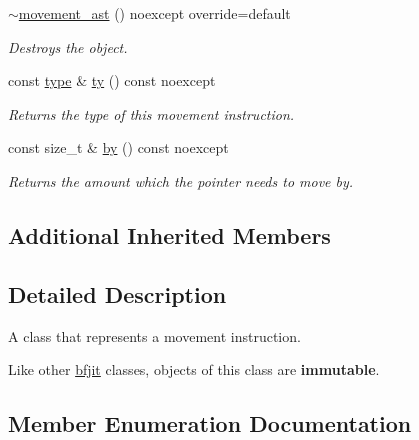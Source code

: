 \begin{DoxyCompactItemize}
\hyperlink{classbfjit_1_1movement__ast_a145ac93e5fa7fc7bcbfddc6d6d4c0d83}{$\sim$movement\+\_\+ast} () noexcept override=default
\begin{DoxyCompactList}\small\item\em Destroys the object. \end{DoxyCompactList}\item 
\hypertarget{classbfjit_1_1movement__ast_ad96cbdcde5bb9ea928896fe8fccf7eae}{}\label{classbfjit_1_1movement__ast_ad96cbdcde5bb9ea928896fe8fccf7eae} 
const \hyperlink{classbfjit_1_1movement__ast_a3aa723a03d76c31e1e88be817670701f}{type} \& \hyperlink{classbfjit_1_1movement__ast_ad96cbdcde5bb9ea928896fe8fccf7eae}{ty} () const noexcept
\begin{DoxyCompactList}\small\item\em Returns the type of this movement instruction. \end{DoxyCompactList}\item 
\hypertarget{classbfjit_1_1movement__ast_ad8d951b3fb908d5f4316214d95162462}{}\label{classbfjit_1_1movement__ast_ad8d951b3fb908d5f4316214d95162462} 
const size\+\_\+t \& \hyperlink{classbfjit_1_1movement__ast_ad8d951b3fb908d5f4316214d95162462}{by} () const noexcept
\begin{DoxyCompactList}\small\item\em Returns the amount which the pointer needs to move {\itshape by}. \end{DoxyCompactList}\end{DoxyCompactItemize}
\subsection*{Additional Inherited Members}


\subsection{Detailed Description}
A class that represents a movement instruction. 

Like other \hyperlink{namespacebfjit}{bfjit} classes, objects of this class are {\bfseries immutable}. 

\subsection{Member Enumeration Documentation}
\hypertarget{classbfjit_1_1movement__ast_a3aa723a03d76c31e1e88be817670701f}{}\label{classbfjit_1_1movement__ast_a3aa723a03d76c31e1e88be817670701f} 
